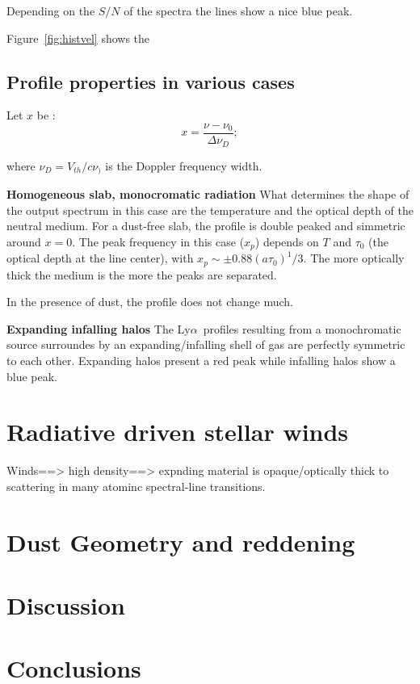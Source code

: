 \documentclass[manuscript]{emulateapj}
\newcommand{\lya}{Ly$\alpha$}
\begin{document}
Depending on the $S/N$ of the spectra the lines show a nice blue peak.

Figure~\ref{fig:histvel} shows the 

\subsection{Profile properties in various cases}

Let $x$ be :
\begin{equation}
x=\frac{\nu - \nu_0}{\Delta \nu_D};
\end{equation}

\noindent
where $\nu_D=V_{th}/c\nu_)$ is the Doppler frequency width.

\noindent
{\bf Homogeneous slab, monocromatic radiation} 
What determines the shape of the output spectrum in this case are the
temperature and the optical depth of the neutral medium.
For a dust-free slab, the profile is double peaked and simmetric
around $x=0$. The peak frequency in this case ($x_p$) depends on $T$
and $\tau_0$ (the optical depth at the line center),
with $x_p \sim \pm 0.88(a\tau_0)^1/3$. The more optically thick the
medium is the more the peaks are separated.

In the presence of dust, the profile does not change much.

{\bf Expanding infalling halos}
The \lya\ profiles resulting from a monochromatic source surroundes by
an expanding/infalling shell of gas are perfectly symmetric to
each other. Expanding halos present a red peak while infalling halos
show a blue peak.


\section{Radiative driven stellar winds}
Winds==> high density==> expnding material is opaque/optically thick
to scattering in many atominc spectral-line transitions.
\section{Dust Geometry and reddening}

\section{Discussion}

\section{Conclusions}
\end{document}
